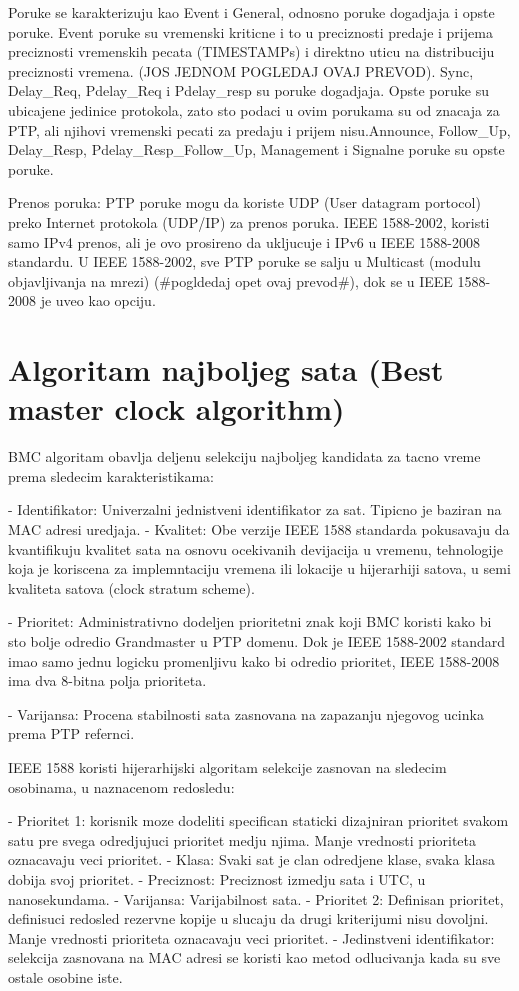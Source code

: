 \documentclass[a4paper,12pt, master]{etf}
\begin{document}
	Poruke se karakterizuju kao Event i General, odnosno poruke dogadjaja i opste poruke. Event
	poruke su vremenski kriticne i to u preciznosti predaje i prijema preciznosti vremenskih 
	pecata (TIMESTAMPs) i direktno uticu na distribuciju preciznosti vremena. (JOS JEDNOM 
	POGLEDAJ OVAJ PREVOD). Sync, Delay\_Req, Pdelay\_Req i Pdelay\_resp su poruke dogadjaja. 
	Opste poruke su ubicajene jedinice protokola, zato sto podaci u ovim porukama su od 
	znacaja za PTP, ali njihovi vremenski pecati za predaju i prijem nisu.Announce, Follow\_Up,
	Delay\_Resp, Pdelay\_Resp\_Follow\_Up, Management i Signalne poruke su opste poruke.

	Prenos poruka:
	PTP poruke mogu da koriste UDP (User datagram portocol) preko Internet protokola (UDP/IP) 
	za prenos poruka. IEEE 1588-2002, koristi samo IPv4 prenos, ali je ovo prosireno da 
	ukljucuje i IPv6 u IEEE 1588-2008 standardu. U IEEE 1588-2002, sve PTP poruke se salju u 
	Multicast (modulu objavljivanja na mrezi) (\#pogldedaj opet ovaj prevod\#), dok se u IEEE 
	1588-2008 je uveo kao opciju.

	\section{Algoritam najboljeg sata (Best master clock algorithm)}
	BMC algoritam obavlja deljenu selekciju najboljeg kandidata za tacno vreme prema sledecim
	karakteristikama:

	- Identifikator: Univerzalni jednistveni identifikator za sat. Tipicno je baziran na MAC 
	adresi uredjaja.
	- Kvalitet: Obe verzije IEEE 1588 standarda pokusavaju da kvantifikuju kvalitet sata na 
	osnovu ocekivanih devijacija u vremenu, tehnologije koja je koriscena za implemntaciju 
	vremena ili lokacije u hijerarhiji satova, u semi kvaliteta satova (clock stratum scheme).

	- Prioritet: Administrativno dodeljen prioritetni znak koji BMC koristi kako bi sto bolje
	odredio Grandmaster u PTP domenu. Dok je IEEE 1588-2002 standard imao samo jednu logicku
	promenljivu kako bi odredio prioritet, IEEE 1588-2008 ima dva 8-bitna polja prioriteta.

	- Varijansa: Procena stabilnosti sata zasnovana na zapazanju njegovog ucinka prema PTP 
	refernci.

	IEEE 1588 koristi hijerarhijski algoritam selekcije zasnovan na sledecim osobinama, u
	naznacenom redosledu:

	- Prioritet 1: korisnik moze dodeliti specifican staticki dizajniran prioritet svakom satu 
	pre	svega odredjujuci prioritet medju njima. Manje vrednosti prioriteta oznacavaju veci 
	prioritet.
	- Klasa: Svaki sat je clan odredjene klase, svaka klasa dobija svoj prioritet.
	- Preciznost: Preciznost izmedju sata i UTC, u nanosekundama.
	- Varijansa: Varijabilnost sata.
	- Prioritet 2: Definisan prioritet, definisuci redosled rezervne kopije u slucaju da drugi
	kriterijumi nisu dovoljni. Manje vrednosti prioriteta oznacavaju veci prioritet.
	- Jedinstveni identifikator: selekcija zasnovana na MAC adresi se koristi kao metod 
	odlucivanja	kada su sve ostale osobine iste.
\end{document}
